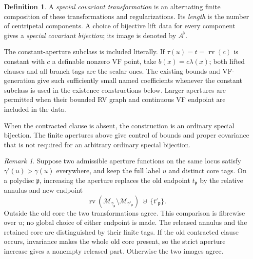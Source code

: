 \documentclass[12pt]{amsart}
\newcommand{\memph}[1]{{\color{magenta}\emph{#1}}}
\theoremstyle{plain}
\theoremstyle{definition}
\newtheorem{defn}[thm]{Definition}
\theoremstyle{remark}
\newtheorem{rem}[thm]{Remark}
\numberwithin{equation}{section}
\theoremstyle{plain}
\newcommand{\MM}{\mdl M}
\newcommand{\gp}{\mathfrak{p}}
\newcommand{\0}{\emptyset}
\newcommand{\mdl}[1]{\mathcal{#1}}  %
\DeclareMathOperator{\rv}{rv}
\begin{document}
\begin{defn}
A \memph{special covariant transformation} is an alternating finite
composition of these transformations and regularizations. Its
\memph{length} is the number of centripetal components. A choice of
bijective lift data for every component gives a \memph{special covariant
bijection}; its image is denoted by $A^\flat$.

The constant-aperture subclass is included literally. If
$\tau(u)=t=\rv(c)$ is constant with $c$ a definable nonzero VF point,
take $b(x)=c\lambda(x)$; both lifted clauses and all branch tags are
the scalar ones. The existing bounds and VF-generation give
such sufficiently small named coefficients whenever the constant
subclass is used in the existence constructions below. Larger apertures
are permitted when their bounded RV graph and continuous VF endpoint
are included in the data.
\end{defn}

When the contracted clause is absent, the construction is an ordinary
special bijection. The finite apertures above give control of bounds and
proper covariance that is not required for an arbitrary ordinary special
bijection.

\begin{rem}\label{bigger:aper}
Suppose two admissible aperture functions on the same locus satisfy
$\gamma'(u)>\gamma(u)$ everywhere, and keep the full label $u$ and
distinct core tags. On a polydisc $\gp$, increasing the aperture replaces
the old endpoint $t_\gp$ by the relative annulus and new endpoint
\[
 \rv(\MM_{\gamma_\gp}\setminus\MM_{\gamma'_\gp})
 \ \uplus\ \{t'_\gp\}.
\]
Outside the old core the two transformations agree. This comparison is
fibrewise over $u$; no global choice of either endpoint is made.
The released annulus and the retained core are distinguished by their
finite tags. If the old contracted clause occurs, invariance makes the
whole old core present, so the strict aperture increase gives a nonempty
released part. Otherwise the two images agree.
\end{rem}
\end{document}
